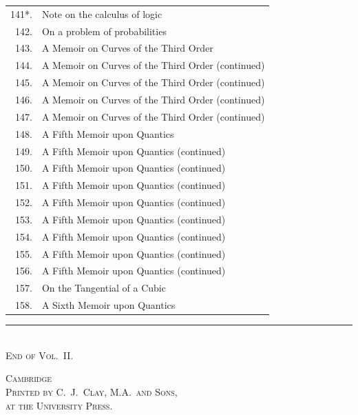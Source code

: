 \documentclass[11pt,a4paper]{article}
\begin{document}
\begin{longtable}{rp{}}
141*. & Note on the calculus of logic \\
142. & On a problem of probabilities \\
143. & A Memoir on Curves of the Third Order \\
144. & A Memoir on Curves of the Third Order (continued) \\
145. & A Memoir on Curves of the Third Order (continued) \\
146. & A Memoir on Curves of the Third Order (continued) \\
147. & A Memoir on Curves of the Third Order (continued) \\
148. & A Fifth Memoir upon Quantics \\
149. & A Fifth Memoir upon Quantics (continued) \\
150. & A Fifth Memoir upon Quantics (continued) \\
151. & A Fifth Memoir upon Quantics (continued) \\
152. & A Fifth Memoir upon Quantics (continued) \\
153. & A Fifth Memoir upon Quantics (continued) \\
154. & A Fifth Memoir upon Quantics (continued) \\
155. & A Fifth Memoir upon Quantics (continued) \\
156. & A Fifth Memoir upon Quantics (continued) \\
157. & On the Tangential of a Cubic \\
158. & A Sixth Memoir upon Quantics \\
\end{longtable}

\vspace{3em}
\begin{center}
\rule{0.5\textwidth}{0.4pt}\\[1em]
\textsc{End of Vol.~II.}
\end{center}

\vspace{2em}
\begin{center}
\textsc{Cambridge}\\
\textsc{Printed by C.~J.~Clay, M.A.\ and Sons,}\\
\textsc{at the University Press.}
\end{center}
\end{document}
